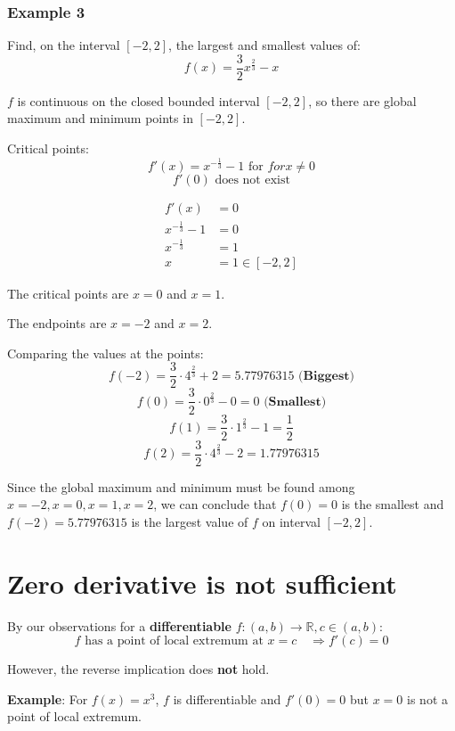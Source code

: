\documentclass[11pt]{article}
\begin{document}
\newpage
\subsubsection{Example 3}
\label{sec:orgb3dcf7c}
Find, on the interval \([-2, 2]\), the largest and smallest values of:
\[f(x) = \frac{3}{2} x^{\frac{2}{3}} - x\]

\(f\) is continuous on the closed bounded interval \([-2, 2]\), so there are global maximum and minimum points in \([-2, 2]\).

Critical points:
\[f'(x) = x^{-\frac{1}{3}} - 1 \text{ for } for x \neq 0\]
\[f'(0) \text{ does not exist}\]

\begin{align*}
f'(x) &= 0 \\
x^{-\frac{1}{3}} - 1 &= 0 \\
x^{-\frac{1}{3}} &= 1 \\
x &= 1 \in [-2, 2]
\end{align*}

The critical points are \(x = 0\) and \(x = 1\).


The endpoints are \(x = -2\) and \(x = 2\).


Comparing the values at the points:
\[f(-2) = \frac{3}{2} \cdot 4^{\frac{2}{3}} + 2 = 5.77976315 \textbf{ (Biggest)}\]
\[f(0) = \frac{3}{2} \cdot 0^{\frac{2}{3}} - 0 = 0 \textbf{ (Smallest)}\]
\[f(1) = \frac{3}{2} \cdot 1^{\frac{2}{3}} - 1 = \frac{1}{2}\]
\[f(2) = \frac{3}{2} \cdot 4^{\frac{2}{3}} - 2 = 1.77976315\]

Since the global maximum and minimum must be found among \(x = -2, x = 0, x = 1, x = 2\), we can conclude that \(f(0) = 0\) is the smallest and \(f(-2) = 5.77976315\) is the largest value of \(f\) on interval \([-2, 2]\).
\section{Zero derivative is not sufficient}
\label{sec:org90c6038}
By our observations for a \textbf{differentiable} \(f : (a, b) \rightarrow \mathbb{R}, c \in (a, b)\):
\[f \text{ has a point of local extremum at } x = c \quad \Rightarrow f'(c) = 0\]

However, the reverse implication does \textbf{not} hold.


\textbf{Example}: For \(f(x) = x^3\), \(f\) is differentiable and \(f'(0) = 0\) but \(x = 0\) is not a point of local extremum.
\end{document}
